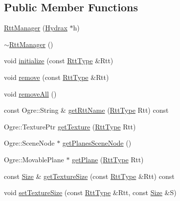 \begin{CompactItemize}
\subsection*{Public Member Functions}
\begin{CompactItemize}
\item 
\hyperlink{class_hydrax_1_1_rtt_manager_5e3cb1cebd7adf7bf69b7b15e120db71}{RttManager} (\hyperlink{class_hydrax_1_1_hydrax}{Hydrax} $\ast$h)
\item 
\hyperlink{class_hydrax_1_1_rtt_manager_bbce4b6993d9362d11366ba11fbee326}{$\sim$RttManager} ()
\item 
void \hyperlink{class_hydrax_1_1_rtt_manager_774efa00a79ade65e726ed0774d2ac2e}{initialize} (const \hyperlink{class_hydrax_1_1_rtt_manager_9753d012b355eba64cff2b19bb6f76ed}{RttType} \&Rtt)
\item 
void \hyperlink{class_hydrax_1_1_rtt_manager_360139ed63706da8ca9ec04716d65574}{remove} (const \hyperlink{class_hydrax_1_1_rtt_manager_9753d012b355eba64cff2b19bb6f76ed}{RttType} \&Rtt)
\item 
void \hyperlink{class_hydrax_1_1_rtt_manager_ed71ea727ed3c835d655437d1c6de232}{removeAll} ()
\item 
const Ogre::String \& \hyperlink{class_hydrax_1_1_rtt_manager_dc5af0a29c8e491e8ea9fba6349e208c}{getRttName} (\hyperlink{class_hydrax_1_1_rtt_manager_9753d012b355eba64cff2b19bb6f76ed}{RttType} Rtt) const 
\item 
Ogre::TexturePtr \hyperlink{class_hydrax_1_1_rtt_manager_4e672cd4cf5361c48e75b559f841602c}{getTexture} (\hyperlink{class_hydrax_1_1_rtt_manager_9753d012b355eba64cff2b19bb6f76ed}{RttType} Rtt)
\item 
Ogre::SceneNode $\ast$ \hyperlink{class_hydrax_1_1_rtt_manager_2c97d4371d854526fb5ffdc37a40a595}{getPlanesSceneNode} ()
\item 
Ogre::MovablePlane $\ast$ \hyperlink{class_hydrax_1_1_rtt_manager_884250dca579c9cdff85bdec278715fe}{getPlane} (\hyperlink{class_hydrax_1_1_rtt_manager_9753d012b355eba64cff2b19bb6f76ed}{RttType} Rtt)
\item 
const \hyperlink{struct_hydrax_1_1_size}{Size} \& \hyperlink{class_hydrax_1_1_rtt_manager_ceb8b7c524ce0e35e493771dab50b4c9}{getTextureSize} (const \hyperlink{class_hydrax_1_1_rtt_manager_9753d012b355eba64cff2b19bb6f76ed}{RttType} \&Rtt) const 
\item 
void \hyperlink{class_hydrax_1_1_rtt_manager_bf7d8e05771b9f904efa09fe94ab0907}{setTextureSize} (const \hyperlink{class_hydrax_1_1_rtt_manager_9753d012b355eba64cff2b19bb6f76ed}{RttType} \&Rtt, const \hyperlink{struct_hydrax_1_1_size}{Size} \&S)

\end{CompactItemize}
\end{CompactItemize}
